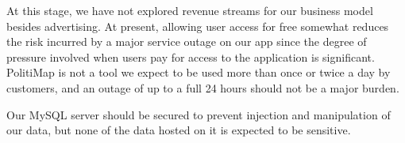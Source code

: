 At this stage, we have not explored revenue streams for our business
model besides advertising. At present, allowing user access for free
somewhat reduces the risk incurred by a major service outage on our
app since the degree of pressure involved when users pay for access to
the application is significant. PolitiMap is not a tool we expect to
be used more than once or twice a day by customers, and an outage of
up to a full 24 hours should not be a major burden.

Our MySQL server should be secured to prevent injection and
manipulation of our data, but none of the data hosted on it is
expected to be sensitive.

\begin{appendix}
\printbibliography
\end{appendix}
